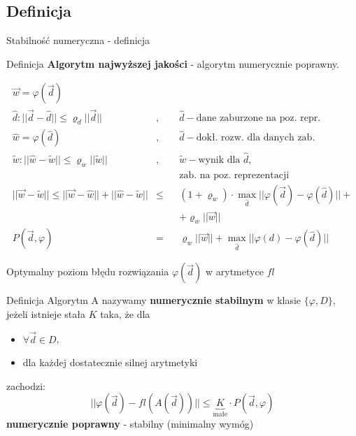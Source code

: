 \subsection{Definicja}
\begin{frame}{Stabilność numeryczna - definicja}
	\begin{block}{Definicja}
    	{\bf Algorytm najwyższej jakości} - algorytm numerycznie poprawny.
    \end{block}
    \vspace{-20pt}
    \begin{align*}
    	\vec{w} = \varphi(\vec{d}) &\\
        \hat{d}: ||\vec{d} - \hat{d}|| \le \varrho_d ||\vec{d} || &,&& 
        	\hat{d} - \text{dane zaburzone na poz. repr.} \\
        \hat{w} = \varphi(\hat{d}) &,&&
        	\hat{d} - \text{dokł. rozw. dla danych zab.} \\
		\tilde{w}: ||\hat{w} - \tilde{w} || \le \varrho_w ||\tilde{w}|| &,&&
        	\tilde{w} - \text{wynik dla $\hat{d}$,} \\
            &&&\text{zab. na poz. reprezentacji} \\
        ||\vec{w} - \tilde{w} || \le ||\vec{w} - \hat{w}|| + ||\hat{w} - \tilde{w}|| &\le&&
        	(1 + \varrho_w) \cdot \max_{\hat{d}} ||\varphi(\vec{d}) - \varphi(\hat{d})|| +\\
            &&&+ \varrho_w ||\vec{w}|| \\
        P(\vec{d}, \varphi) &=&& \varrho_w ||\vec{w}|| + \max_{\hat{d}} ||\varphi(d) - \varphi(\hat{d})||
    \end{align*}
\end{frame}
\begin{frame}{Optymalny poziom błędu rozwiązania $\varphi(\vec{d})$ w arytmetyce $fl$}
	\begin{block}{Definicja}
		Algorytm A nazywamy {\bf numerycznie stabilnym} w klasie $\{\varphi, D\}$, jeżeli istnieje stała $K$ taka, że dla
        \begin{itemize}
        	\item $\forall \vec{d} \in D$,
            \item dla każdej dostatecznie silnej arytmetyki
        \end{itemize}
        zachodzi:
        \[
        	||\varphi(\vec{d}) - fl(A(\vec{d}))|| \le \underbrace{K}_\text{małe} \cdot P(\vec{d}, \varphi)
        \]
        {\bf numerycznie poprawny} - stabilny (minimalny wymóg)
	\end{block}
\end{frame}